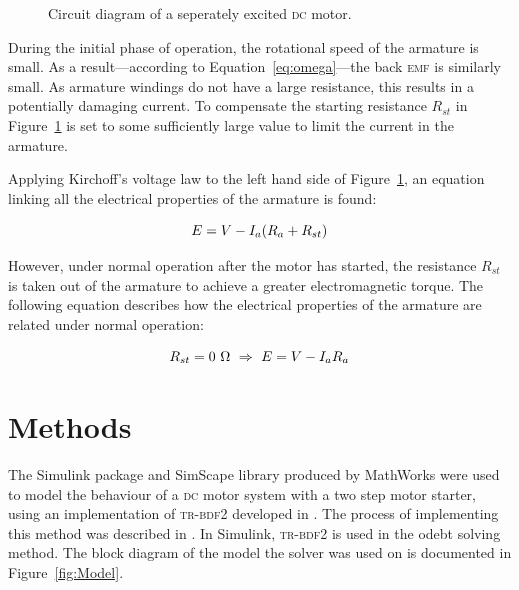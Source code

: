 \documentclass[a4paper,10pt]{article}
\newcommand{\Ohm}{\si{\ohm}\xspace}
\newcommand{\DC}{\textsc{dc}\xspace}
\newcommand{\EMF}{\textsc{emf}\xspace}
\newcommand{\TRBDFII}{\textsc{tr-bdf\footnotesize2}\xspace}
\newcommand{\odetwothreebt}{ode\oldstylenums{23}bt\xspace}
\begin{document}
\begin{figure}[h]
    \centering
    \def\svgwidth{0.6\textwidth}
    
    \caption{Circuit diagram of a seperately excited \DC motor.}
    \label{fig:Circuit}
\end{figure}

During the initial phase of operation, the rotational speed of the armature is 
small. As a result---according to Equation~\ref{eq:omega}---the back \EMF is 
similarly small. As armature windings do not have a large resistance, this 
results in a potentially damaging current. To compensate the starting 
resistance $R_{st}$ in  Figure~\ref{fig:Circuit} is set to some sufficiently 
large value to limit the current in the armature.

Applying Kirchoff's voltage law to the left hand side of 
Figure~\ref{fig:Circuit}, an equation linking all the electrical properties of 
the armature is found:

\begin{equation}  \label{eq:ERst}
    E = V - I_a(R_a + R_{st}) \\
\end{equation}

However, under normal operation after the motor has started, the resistance 
$R_{st}$ is taken out of the armature to achieve a greater electromagnetic 
torque. The following equation describes how the electrical properties of the 
armature are related under normal operation:

\begin{equation}  \label{eq:E}
    R_{st} = 0~\Ohm ~\Rightarrow~ E = V - I_a R_a \\
\end{equation}

\section{Methods}

The Simulink package and SimScape library produced by MathWorks were used to 
model the behaviour of a \DC motor system with a two step motor starter, using 
an implementation of \TRBDFII developed in \cite{bank1985transient}. The 
process of implementing this method was described in \cite{hosea1996analysis}. 
In Simulink, \TRBDFII is used in the \odetwothreebt solving method. The block 
diagram of the model the solver was used on is documented in 
Figure~\vref{fig:Model}. 
\end{document}
